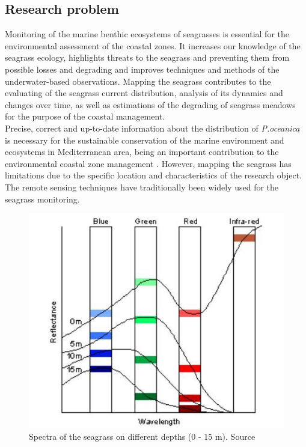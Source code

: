 \documentclass[10pt, a4paper]{article}
\begin{document}
\subsection{Research problem}
Monitoring of the marine benthic ecosystems of seagrasses is essential for the environmental
assessment of the coastal zones. It increases our knowledge of the seagrass ecology, highlights 
threats to the seagrass and preventing them from possible losses and degrading and improves
techniques and methods of the underwater-based observations. Mapping the seagrass contributes to
the evaluating of the seagrass current distribution, analysis of its dynamics and changes over time, as
well as estimations of the degrading of seagrass meadows for the purpose of the coastal management.\\
Precise, correct and up-to-date information about the distribution of \textit{P.oceanica} is necessary for the
sustainable conservation of the marine environment and ecosystems in Mediterranean area, being an
important contribution to the environmental coastal zone management \cite{Pergent-Martini06}\label{Pergent-Martini06}.
However, mapping the seagrass has limitations due to the specific location and characteristics of the
research object. The remote sensing techniques have traditionally been widely used for the seagrass
monitoring. 

\begin{figure}
	\centering
	\includegraphics[scale=0.25]{Fig-1-9.jpg}
	\caption{Spectra of the seagrass on different depths (0 - 15 m). Source \cite{Edwards00}\label{Edwards00}}
	\label{fig:9}
\end{figure}
\end{document}
